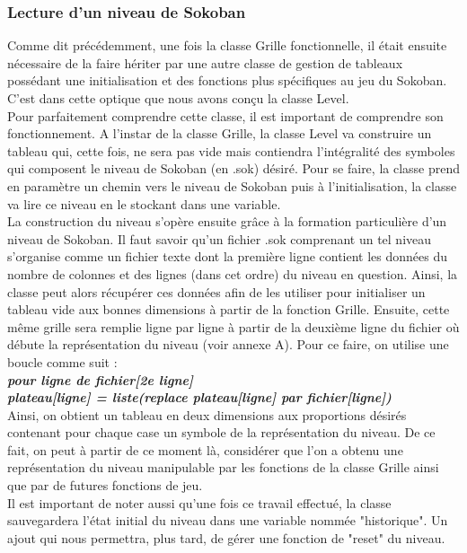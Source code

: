 \documentclass[a4paper,12pt]{article} %
\begin{document}
\subsubsection{Lecture d'un niveau de Sokoban}

Comme dit précédemment, une fois la classe Grille fonctionnelle, il était ensuite nécessaire de la faire hériter par une autre classe de gestion de tableaux possédant une initialisation et des fonctions plus spécifiques au jeu du Sokoban. C'est dans cette optique que nous avons conçu la classe Level.
\\
Pour parfaitement comprendre cette classe, il est important de comprendre son fonctionnement. A l'instar de la classe Grille, la classe Level va construire un tableau qui, cette fois, ne sera pas vide mais contiendra l’intégralité des symboles qui composent le niveau de Sokoban (en .sok) désiré. Pour se faire, la classe prend en paramètre un chemin vers le niveau de Sokoban puis à l'initialisation, la classe va lire ce niveau en le stockant dans une variable.
\\
La construction du niveau s'opère ensuite grâce à la formation particulière d'un niveau de Sokoban. Il faut savoir qu'un fichier .sok comprenant un tel niveau s'organise comme un fichier texte dont la première ligne contient les données du nombre de colonnes et des lignes (dans cet ordre) du niveau en question. Ainsi, la classe peut alors récupérer ces données afin de les utiliser pour initialiser un tableau vide aux bonnes dimensions à partir de la fonction Grille. Ensuite, cette même grille sera remplie ligne par ligne à partir de la deuxième ligne du fichier où débute la représentation du niveau (voir annexe A). Pour ce faire, on utilise une boucle comme suit :
\\
\textbf{\emph{
\tabto{2em}pour ligne de fichier[2e ligne] \\
	\tabto{4em}plateau[ligne] = liste(replace plateau[ligne] par fichier[ligne])
}}
\\
Ainsi, on obtient un tableau en deux dimensions aux proportions désirés contenant pour chaque case un symbole de la représentation du niveau. De ce fait, on peut à partir de ce moment là, considérer que l'on a obtenu une représentation du niveau manipulable par les fonctions de la classe Grille ainsi que par de futures fonctions de jeu.
\\
Il est important de noter aussi qu'une fois ce travail effectué, la classe sauvegardera l'état initial du niveau dans une variable nommée "historique". Un ajout qui nous permettra, plus tard, de gérer une fonction de "reset" du niveau.
\end{document}
